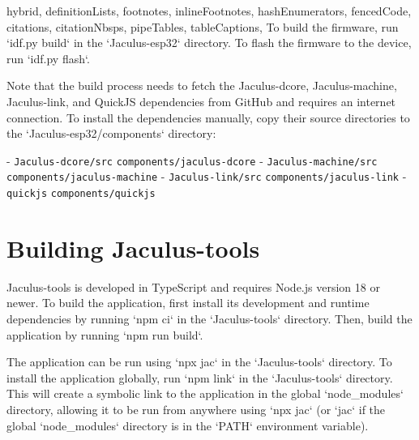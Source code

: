 \begin{markdown*}{%
  hybrid,
  definitionLists,
  footnotes,
  inlineFootnotes,
  hashEnumerators,
  fencedCode,
  citations,
  citationNbsps,
  pipeTables,
  tableCaptions,
}
To build the firmware, run `idf.py build` in the `Jaculus-esp32` directory. To flash the firmware to the device, run `idf.py flash`.

Note that the build process needs to fetch the Jaculus-dcore, Jaculus-machine, Jaculus-link, and QuickJS dependencies from GitHub and requires an internet connection. To install the dependencies manually, copy their source directories to the `Jaculus-esp32/components` directory:

- \texttt{Jaculus-dcore/src} \rightarrow \texttt{components/jaculus-dcore}
- \texttt{Jaculus-machine/src} \rightarrow \texttt{components/jaculus-machine}
- \texttt{Jaculus-link/src} \rightarrow \texttt{components/jaculus-link}
- \texttt{quickjs} \rightarrow \texttt{components/quickjs}


\chapter{Building Jaculus-tools}

Jaculus-tools is developed in TypeScript and requires Node.js version 18 or newer. To build the application, first install its development and runtime dependencies by running `npm ci` in the `Jaculus-tools` directory. Then, build the application by running `npm run build`.

The application can be run using `npx jac` in the `Jaculus-tools` directory. To install the application globally, run `npm link` in the `Jaculus-tools` directory. This will create a symbolic link to the application in the global `node_modules` directory, allowing it to be run from anywhere using `npx jac` (or `jac` if the global `node_modules` directory is in the `PATH` environment variable).


\end{markdown*}
